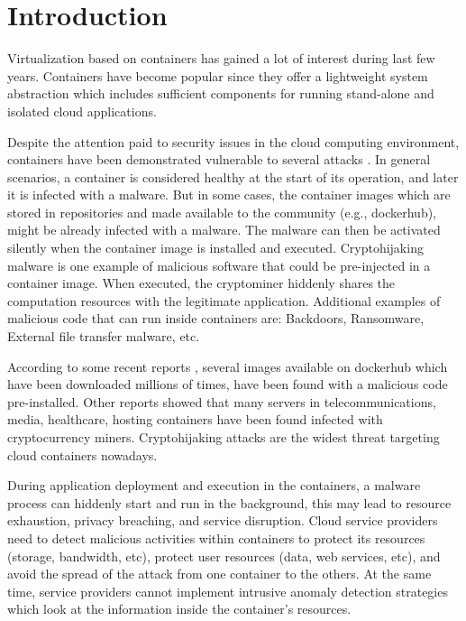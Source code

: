 \section{Introduction}\label{sec:intro}

Virtualization based on containers has gained a lot of interest during last few years. Containers have become popular since they offer a lightweight system abstraction which includes sufficient components for running stand-alone and isolated cloud applications.

Despite the attention paid to security issues in the cloud computing environment, containers have been demonstrated vulnerable to several attacks \cite{mattetti2015securing,abed2015intrusion}. In general scenarios, a container is considered healthy at the start of its operation, and later it is infected with a malware. But in some cases, the container images which are stored in repositories and made available to the community (e.g., dockerhub), might be already infected with a malware. The malware can then be activated silently when the container image is installed and executed. Cryptohijaking malware is one example of malicious software that could be pre-injected in a container image. When executed, the cryptominer hiddenly shares the computation resources with the legitimate application. Additional examples of malicious code that can run inside containers are: Backdoors, Ransomware, External file transfer malware, etc.

According to some recent reports \cite{Backdoored}, several images available on dockerhub which have been downloaded millions of times, have been found with a malicious code pre-installed. Other reports showed that many servers in telecommunications, media, healthcare, hosting containers have been found infected with cryptocurrency miners. Cryptohijaking attacks are the widest threat targeting cloud containers nowadays.

During application deployment and execution in the containers, a malware process can hiddenly start and run in the background, this may lead to resource exhaustion, privacy breaching, and service disruption. Cloud service providers need to detect malicious activities within containers to protect its resources (storage, bandwidth, etc), protect user resources (data, web services, etc), and avoid the spread of the attack from one container to the others. At the same time, service providers cannot implement intrusive anomaly detection strategies which look at the information inside the container's resources.

